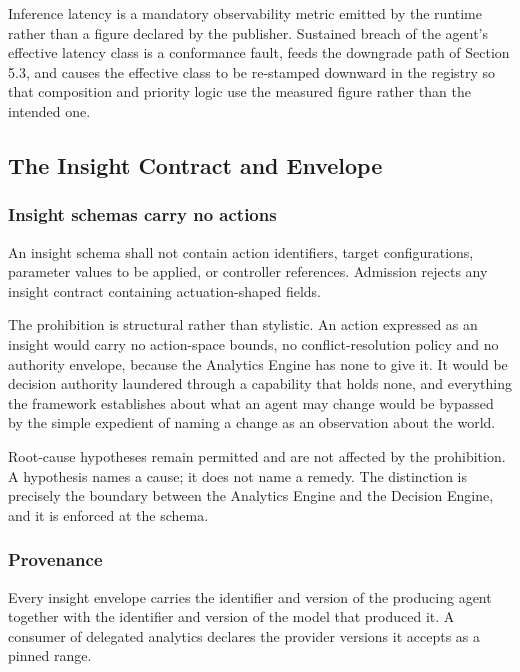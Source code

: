 Inference latency is a mandatory observability metric emitted by the
runtime rather than a figure declared by the publisher. Sustained breach
of the agent's effective latency class is a conformance fault, feeds the
downgrade path of Section 5.3, and causes the effective class to be
re-stamped downward in the registry so that composition and priority
logic use the measured figure rather than the intended one.

\hypertarget{the-insight-contract-and-envelope}{%
\subsection{The Insight Contract and Envelope}\label{the-insight-contract-and-envelope}}

\hypertarget{insight-schemas-carry-no-actions}{%
\subsubsection{Insight schemas carry no actions}\label{insight-schemas-carry-no-actions}}

An insight schema shall not contain action identifiers, target
configurations, parameter values to be applied, or controller
references. Admission rejects any insight contract containing
actuation-shaped fields.

The prohibition is structural rather than stylistic. An action expressed
as an insight would carry no action-space bounds, no conflict-resolution
policy and no authority envelope, because the Analytics Engine has none
to give it. It would be decision authority laundered through a
capability that holds none, and everything the framework establishes
about what an agent may change would be bypassed by the simple expedient
of naming a change as an observation about the world.

Root-cause hypotheses remain permitted and are not affected by the
prohibition. A hypothesis names a cause; it does not name a remedy. The
distinction is precisely the boundary between the Analytics Engine and
the Decision Engine, and it is enforced at the schema.

\hypertarget{provenance}{%
\subsubsection{Provenance}\label{provenance}}

Every insight envelope carries the identifier and version of the
producing agent together with the identifier and version of the model
that produced it. A consumer of delegated analytics declares the
provider versions it accepts as a pinned range.

